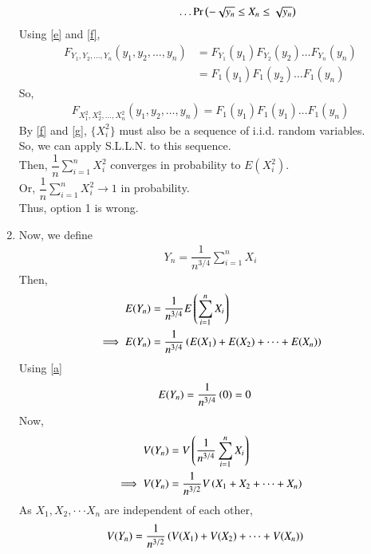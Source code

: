 \documentclass[journal,12pt,twocolumn]{IEEEtran}
\begin{document}
\begin{enumerate}
\begin{align}
            &\hspace{2cm} \dots \Pr\left(-\sqrt{y_n} \leq X_n \leq \sqrt{y_n}\right)
        \end{align}
        Using \eqref{e} and \eqref{f},
        \begin{align}
            F_{Y_1,Y_2,\dots,Y_n}(y_1,y_2,\dots,y_n)&=F_{Y_1}(y_1) F_{Y_2}(y_2)\dots F_{Y_n}(y_n)\\
            &=F_1(y_1) F_1(y_2) \dots F_1(y_n)
        \end{align}
        So,
        \begin{align} \label{g}
            F_{X_1^2,X_2^2,\dots,X_n^2}(y_1,y_2,\dots,y_n)=F_1(y_1) F_1(y_1)\dots F_1(y_n)
        \end{align}
        By \eqref{f} and \eqref{g}, $\{X_i^2\}$ must also be a sequence of i.i.d. random variables.\\
        So, we can apply S.L.L.N. to this sequence.\\
        Then, $\dfrac{1}{n}\sum_{i=1}^nX_i^2$ converges in probability to $E(X_i^2)$.\\
        Or, $\dfrac{1}{n}\sum_{i=1}^nX_i^2 \to 1$ in probability.\\
        Thus, option 1 is wrong.
    \item
        Now, we define
        \begin{align}
            Y_n=\dfrac{1}{n^{3/4}}\sum_{i=1}^nX_i
        \end{align}
        Then,
        \begin{align}
            E(Y_n) &= \dfrac{1}{n^{3/4}}E\left(\sum_{i=1}^nX_i\right) \\
            \implies E(Y_n) &= \dfrac{1}{n^{3/4}}\left(E(X_1)+E(X_2)+ \dots +E(X_n)\right)
        \end{align}
        Using \eqref{a}
        \begin{align}
            E(Y_n) &= \dfrac{1}{n^{3/4}}\left(0\right) =0
        \end{align}
        Now,
        \begin{align}
            V(Y_n) &= V\left(\dfrac{1}{n^{3/4}}\sum_{i=1}^nX_i\right) \\
            \implies V(Y_n) &= \dfrac{1}{n^{3/2}}V\left(X_1+X_2+ \dots +X_n\right)
        \end{align}
        As $X_1, X_2, \cdot \cdot \cdot X_n$ are independent of each other,
        \begin{align}
            V(Y_n) &= \dfrac{1}{n^{3/2}}\left(V(X_1)+V(X_2)+ \dots +V(X_n)\right)
        \end{align}

\end{enumerate}
\end{document}
